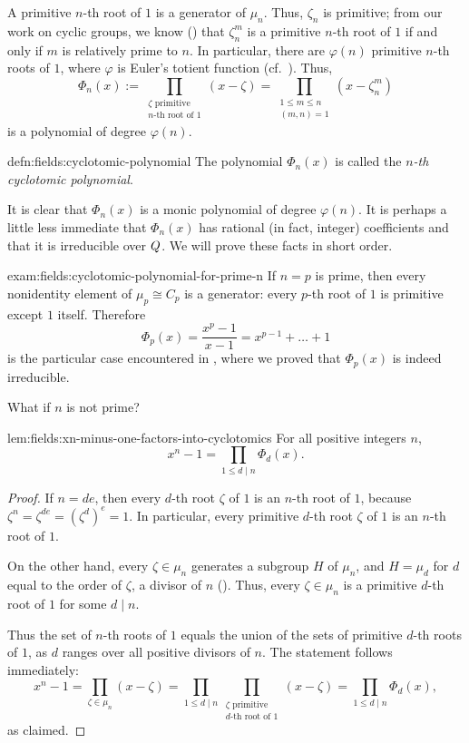 A primitive $n$-th root of $1$ is a generator of $\mu_n$. Thus,
$\zeta_n$ is primitive; from our work on cyclic groups, we know
() that $\zeta_n^m$ is a primitive
$n$-th root of $1$ if and only if $m$ is relatively prime to $n$. In
particular, there are $\varphi(n)$ primitive $n$-th roots of $1$,
where $\varphi$ is Euler's totient function (cf.\
). Thus,
\[
  \Phi_n(x) := \prod_{\substack{\zeta \text{ primitive} \\ n\text{-th
        root of }1}} (x - \zeta) = \prod_{\substack{1 \leq m \leq n \\
      (m,n)=1}} (x - \zeta_n^m)
\]
is a polynomial of degree $\varphi(n)$.
\begin{defn}{}{defn:fields:cyclotomic-polynomial}
  The polynomial $\Phi_n(x)$ is called the \emph{$n$-th cyclotomic
    polynomial}.
\end{defn}
It is clear that $\Phi_n(x)$ is a monic polynomial of degree
$\varphi(n)$.  It is perhaps a little less immediate that $\Phi_n(x)$
has rational (in fact, integer) coefficients and that it is
irreducible over $Q$. We will prove these facts in short order.
\begin{exam}{}{exam:fields:cyclotomic-polynomial-for-prime-n}
  If $n = p$ is prime, then every nonidentity element of
  $\mu_p \cong C_p$ is a generator: every $p$-th root of $1$ is
  primitive except $1$ itself.  Therefore
  \[
    \Phi_p(x) = \frac{x^p - 1}{x - 1} = x^{p-1} + \dots + 1
  \]
  is the particular case encountered in , where
  we proved that $\Phi_p(x)$ is indeed irreducible.
\end{exam}
What if $n$ is not prime?
\begin{lem}{}{lem:fields:xn-minus-one-factors-into-cyclotomics}
  For all positive integers $n$,
  \[
    x^n - 1 = \prod_{1 \leq d \mid n} \Phi_d(x).
  \]
\end{lem}
\begin{proof}
  If $n = de$, then every $d$-th root $\zeta$ of $1$ is an $n$-th root
  of $1$, because $\zeta^n = \zeta^{de} = (\zeta^d)^e = 1$. In
  particular, every primitive $d$-th root $\zeta$ of $1$ is an $n$-th
  root of $1$.

  On the other hand, every $\zeta \in \mu_n$ generates a subgroup $H$
  of $\mu_n$, and $H = \mu_d$ for $d$ equal to the order of $\zeta$, a
  divisor of $n$ (\Cref{prop:groups:subgroups-of-znz}). Thus, every
  $\zeta \in \mu_n$ is a primitive $d$-th root of $1$ for some
  $d \mid n$.

  Thus the set of $n$-th roots of $1$ equals the union of the sets of
  primitive $d$-th roots of $1$, as $d$ ranges over all positive
  divisors of $n$. The statement follows immediately:
  \[
    x^n - 1 = \prod_{\zeta \in \mu_n} (x - \zeta) = \prod_{1 \leq d
      \mid n} \prod_{\substack{\zeta \text{ primitive} \\ d\text{-th
          root of }1}} (x - \zeta) = \prod_{1 \leq d \mid n}
    \Phi_d(x),
  \]
  as claimed.
\end{proof}
